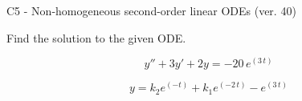 \begin{exercise}
  \begin{exerciseTitle}C5 - Non-homogeneous second-order linear ODEs (ver. 40)\end{exerciseTitle}
  \begin{exerciseStatement}
    
Find the solution to the given ODE.

    
\[y''+3y'+2y = -20 \, e^{\left(3 \, t\right)}\]

  \end{exerciseStatement}
  \begin{exerciseAnswer}
    
\[y= k_{2} e^{\left(-t\right)} + k_{1} e^{\left(-2 \, t\right)} - e^{\left(3 \, t\right)}\]

  \end{exerciseAnswer}
\end{exercise}